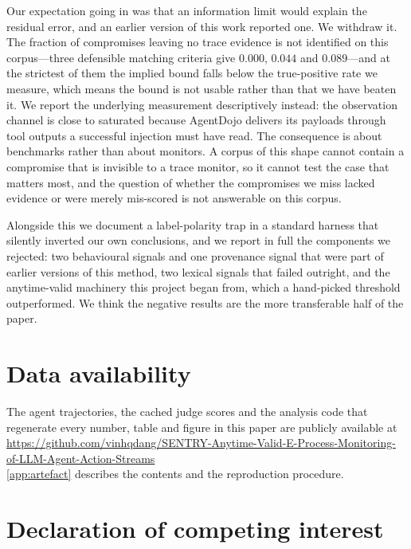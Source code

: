 \documentclass[preprint,12pt,authoryear]{elsarticle}
\theoremstyle{definition}
\begin{document}
Our expectation going in was that an information limit would explain the residual
error, and an earlier version of this work reported one. We withdraw it. The
fraction of compromises leaving no trace evidence is not identified on this
corpus---three defensible matching criteria give $0.000$, $0.044$ and $0.089$---and
at the strictest of them the implied bound falls below the true-positive rate we
measure, which means the bound is not usable rather than that we have beaten it. We
report the underlying measurement descriptively instead: the observation channel is
close to saturated because AgentDojo delivers its payloads through tool outputs a
successful injection must have read. The consequence is about benchmarks rather
than about monitors. A corpus of this shape cannot contain a compromise that is
invisible to a trace monitor, so it cannot test the case that matters most, and the
question of whether the compromises we miss lacked evidence or were merely
mis-scored is not answerable on this corpus.

Alongside this we document a label-polarity trap in a standard harness that
silently inverted our own conclusions, and we report in full the components we
rejected: two behavioural signals and one provenance signal that were part of
earlier versions of this method, two lexical signals that failed outright, and the
anytime-valid machinery this project began from, which a hand-picked threshold
outperformed. We think the negative results are the more
transferable half of the paper.

\section*{Data availability}

The agent trajectories, the cached judge scores and the analysis code that
regenerate every number, table and figure in this paper are publicly available
at\\
\url{https://github.com/vinhqdang/SENTRY-Anytime-Valid-E-Process-Monitoring-of-LLM-Agent-Action-Streams}\\
\ref{app:artefact} describes the contents and the reproduction procedure.

\section*{Declaration of competing interest}
\end{document}

